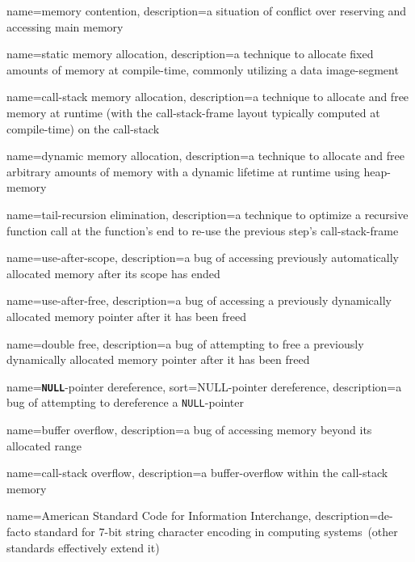 {
  name={memory contention},
  description={a situation of conflict over reserving and accessing main memory}
}

{
  name={static memory allocation},
  description={a technique to allocate fixed amounts of memory at compile-time, commonly utilizing a data \gls{image-segment}}
}

{
  name={\gls{call-stack} memory allocation},
  description={a technique to allocate and free memory at runtime (with the \gls{call-stack-frame} layout typically computed at compile-time) on the \gls{call-stack}}
}

{
  name={dynamic memory allocation},
  description={a technique to allocate and free arbitrary amounts of memory with a dynamic lifetime at runtime using \gls{heap-memory}}
}

{
  name={tail-recursion elimination},
  description={a technique to optimize a recursive function call at the function's end to re-use the previous step's \gls{call-stack-frame}}
}

{
  name={use-after-scope},
  description={a bug of accessing previously automatically allocated memory after its scope has ended}
}

{
  name={use-after-free},
  description={a bug of accessing a previously dynamically allocated memory pointer after it has been freed}
}

{
  name={double free},
  description={a bug of attempting to free a previously dynamically allocated memory pointer after it has been freed}
}

{
  name={\texttt{\textbf{NULL}}-pointer dereference},
  sort={NULL-pointer dereference},
  description={a bug of attempting to dereference a \lstinline[style=c]|NULL|-pointer}
}

{
  name={buffer overflow},
  description={a bug of accessing memory beyond its allocated range}
}

{
  name={\gls{call-stack} overflow},
  description={a \gls{buffer-overflow} within the \gls{call-stack} memory}
}

{
  name={American Standard Code for Information Interchange},
  description={de-facto standard for 7-bit string character encoding in computing systems~(other standards effectively extend it)}
}

